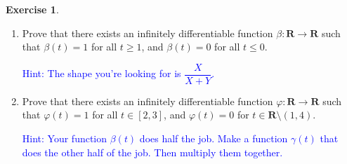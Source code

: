 \documentclass{article}
\newcommand{\R}{\mathbf{R}}
\theoremstyle{plain} %
\numberwithin{thm}{section} %
\theoremstyle{definition}
\newtheorem{exercise}[thm]{Exercise} %
\begin{document}
\begin{exercise}
\begin{enumerate}[label=(\alph*)]
\begin{proof}
            \end{proof}
    
            \item Prove that there exists an infinitely differentiable function $\beta:\R\rightarrow \R$ such that $\beta(t)=1$ for all $t\geq 1$, and $\beta(t)=0$ for all $t\leq 0$.
    
            \textcolor{blue}{Hint: The shape you're looking for is $\dfrac{X}{X+Y}$.}
    
            \item Prove that there exists an infinitely differentiable function $\varphi:\R\rightarrow \R$ such that $\varphi(t)=1$ for all $t\in [2,3]$, and $\varphi(t)=0$ for $t\in \R\setminus (1,4)$.
    
            \textcolor{blue}{Hint: Your function $\beta(t)$ does half the job. Make a function $\gamma(t)$ that does the other half of the job. Then multiply them together.}
        \end{enumerate}
    \end{exercise}
\end{document}
